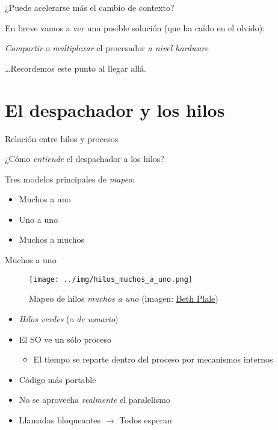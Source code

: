 \documentclass[presentation]{beamer}
\begin{document}
\begin{frame}[label={sec:orgb41ce39}]{¿Puede acelerarse más el cambio de contexto?}
\begin{center}
En breve vamos a ver una posible solución (que ha caído en el olvido):

\emph{Compartir} o \emph{multiplexar} el procesador \emph{a nivel hardware}

\ldots{}Recordemos este punto al llegar allá.
\end{center}
\end{frame}


\section{El despachador y los hilos}
\label{sec:orgadd2cec}
\begin{frame}[label={sec:org3427258}]{Relación entre hilos y procesos}
\begin{center}
¿Cómo \emph{entiende} el despachador a los hilos?

Tres modelos principales de \emph{mapeo}:
\end{center}
\begin{itemize}
\item Muchos a uno
\item Uno a uno
\item Muchos a muchos
\end{itemize}
\end{frame}

\begin{frame}[label={sec:org3c019c9}]{Muchos a uno}
\begin{figure}[htbp]
\centering
\texttt{[image: ../img/hilos\_muchos\_a\_uno.png]}
\caption{Mapeo de hilos \emph{muchos a uno} (imagen: \href{http://www.cs.indiana.edu/classes/b534-plal/ClassNotes/sched-synch-details4.pdf}{Beth Plale})}
\end{figure}
\begin{itemize}
\item \emph{Hilos verdes} (o \emph{de usuario})
\item El SO ve un sólo proceso
\begin{itemize}
\item El tiempo se reparte dentro del proceso por mecanismos internos
\end{itemize}
\item Código más portable
\item No se aprovecha \emph{realmente} el paralelismo
\item Llamadas bloqueantes \(\rightarrow\) Todos esperan
\end{itemize}
\end{frame}
\end{document}
